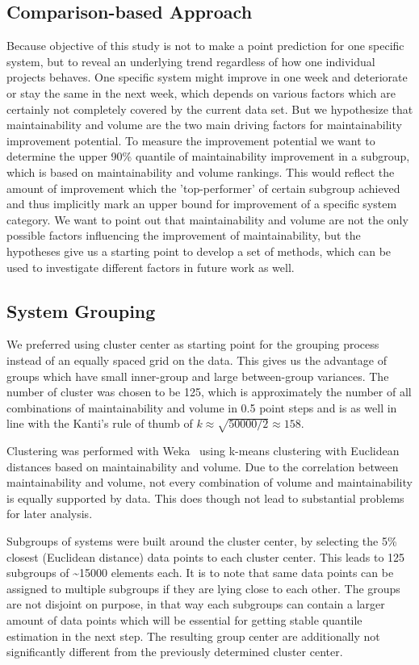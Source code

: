 \subsection{Comparison-based Approach}
Because objective of this study is not to make a point prediction for one specific system, but to reveal an underlying trend regardless of how one individual projects behaves. One specific system might improve in one week and deteriorate or stay the same in the next week, which depends on various factors which are certainly not completely covered by the current data set. But we hypothesize that maintainability and volume are the two main driving factors for maintainability improvement potential. To measure the improvement potential we want to determine the upper 90\% quantile of maintainability improvement in a subgroup, which is based on maintainability and volume rankings. This would reflect the amount of improvement which the 'top-performer' of certain subgroup achieved and thus implicitly mark an upper bound for improvement of a specific system category. We want to point out that maintainability and volume are not the only possible factors influencing the improvement of maintainability, but the hypotheses give us a starting point to develop a set of methods, which can be used to investigate different factors in future work as well.

\subsection{System Grouping}
We preferred using cluster center as starting point for the grouping process instead of an equally spaced grid on the data. This gives us the advantage of groups which have small inner-group and large between-group variances.
The number of cluster was chosen to be 125, which is approximately the number of all combinations of maintainability and volume in 0.5 point steps and is as well in line with the Kanti's rule of thumb \cite{kanti1979multivariate} of \(k\approx\sqrt{50000/2}\approx158\). 

Clustering was performed with Weka~\cite{hall2009weka} using k-means clustering with Euclidean distances based on maintainability and volume.
Due to the correlation between maintainability and volume, not every combination of volume and maintainability is equally supported by data. This does though not lead to substantial problems for later analysis.

Subgroups of systems were built around the cluster center, by selecting the 5\% closest (Euclidean distance) data points to each cluster center. This leads to 125 subgroups of \textasciitilde15000 elements each. It is to note that same data points can be assigned to multiple subgroups if they are lying close to each other. The groups are not disjoint on purpose, in that way each subgroups can contain a larger amount of data points which will be essential for getting stable quantile estimation in the next step. The resulting group center are additionally not significantly different from the previously determined cluster center.

